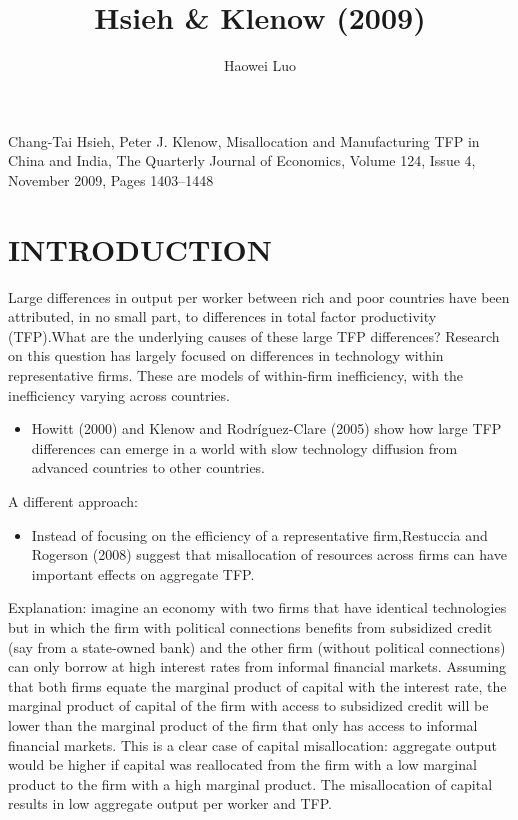\documentclass{article}
\title{Hsieh \& Klenow (2009)}
\author{Haowei Luo}
\begin{document}
\maketitle
Chang-Tai Hsieh, Peter J. Klenow, Misallocation and Manufacturing TFP in China and India, The Quarterly Journal of Economics, Volume 124, Issue 4, November 2009, Pages 1403–1448
\section*{INTRODUCTION}
Large differences in output per worker between rich and poor countries have been attributed, in no small part, to differences in total factor productivity (TFP).What are the underlying causes of these large TFP differences? Research on this question has largely focused on differences in technology within representative firms. These are models of within-firm inefficiency, with the inefficiency varying across countries.

\begin{itemize}
    \item Howitt (2000) and Klenow and Rodríguez-Clare (2005) show how
large TFP differences can emerge in a world with slow technology diffusion from advanced countries to other countries.
\end{itemize}

A different approach:
\begin{itemize}
    \item Instead of focusing on the efficiency of a representative firm,Restuccia and Rogerson (2008) suggest that misallocation of resources across firms can have important effects on aggregate TFP.
\end{itemize}

Explanation: imagine an economy with two firms that have identical technologies but in which the firm with political connections benefits from subsidized credit (say from a state-owned bank) and the other firm (without political connections) can only borrow at high interest rates from informal financial markets. Assuming that both firms equate the marginal product of capital with the interest rate, the marginal product of capital of the firm with access to subsidized credit will be lower than the marginal product of the firm that only has access to informal financial markets. This is a clear case of capital misallocation: aggregate output would be higher if capital was reallocated from the firm with a low marginal product to the firm with a high marginal product. The misallocation of capital results in low aggregate output per worker and TFP.
\end{document}
